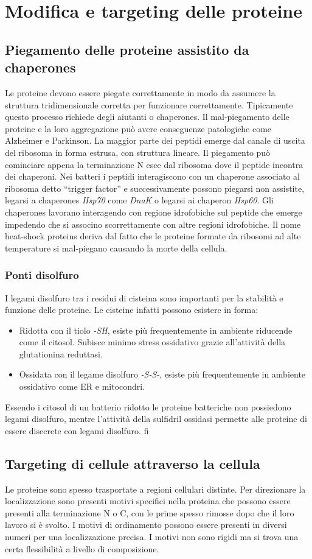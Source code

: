 \chapter{Modifica e targeting delle proteine}
\section{Piegamento delle proteine assistito da chaperones}
Le proteine devono essere piegate correttamente in modo da assumere la struttura tridimensionale corretta per funzionare correttamente. Tipicamente questo processo richiede degli aiutanti o chaperones. Il mal-piegamento delle
proteine e la loro aggregazione pu\`o avere conseguenze patologiche come Alzheimer e Parkinson. La maggior parte dei peptidi emerge dal canale di uscita del ribosoma in forma estrusa, con struttura lineare. Il piegamento pu\`o 
cominciare appena la terminazione N esce dal ribosoma dove il peptide incontra dei chaperoni. Nei batteri i peptidi interagiscono con un chaperone associato al ribosoma detto ``trigger factor'' e successivamente possono
piegarsi non assistite, legarsi a chaperones \emph{Hsp70} come \emph{DnaK} o legarsi ai chaperon \emph{Hsp60}. Gli chaperones lavorano interagendo con regione idrofobiche sul peptide che emerge impedendo che si associno 
scorrettamente con altre regioni idrofobiche. Il nome heat-shock proteins deriva dal fatto che le proteine formate da ribosomi ad alte temperature si mal-piegano causando la morte della cellula. 
\subsection{Ponti disolfuro}
I legami disolfuro tra i residui di cisteina sono importanti per la stabilit\`a e funzione delle proteine. Le cisteine infatti possono esistere in forma:
\begin{itemize}
	\item Ridotta con il tiolo \emph{-SH}, esiste pi\`u frequentemente in ambiente riducende come il citosol. Subisce minimo stress ossidativo grazie all'attivit\`a della glutationina reduttasi.
	\item Ossidata con il legame disolfuro \emph{-S-S-}, esiste pi\`u frequentemente in ambiente ossidativo come ER e mitocondri.
\end{itemize}
Essendo i citosol di un batterio ridotto le proteine batteriche non possiedono legami disolfuro, mentre l'attivit\`a della sulfidril ossidasi permette alle proteine di essere disecrete con legami disolfuro. fi
\section{Targeting di cellule attraverso la cellula}
Le proteine sono spesso trasportate a regioni cellulari distinte. Per direzionare la localizzazione sono presenti motivi specifici nella proteina che possono essere presenti alla terminazione N o C, con le prime spesso rimosse
dopo che il loro lavoro si \`e svolto. I motivi di ordinamento possono essere presenti in diversi numeri per una localizzazione precisa. I motivi non sono rigidi ma si trova una certa flessibilit\`a a livello di composizione. 

